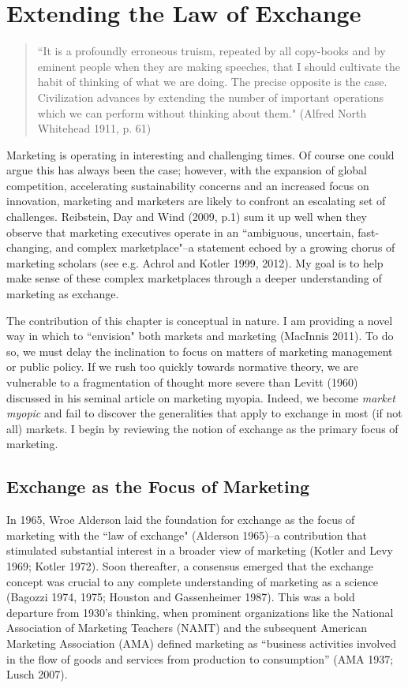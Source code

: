 \chapter{Extending the Law of Exchange\label{law}}

\begin{small}
\begin{quote}
``It is a profoundly erroneous truism, repeated by all copy-books and by eminent people when they are making speeches, that I should cultivate the habit of thinking of what we are doing. The precise opposite is the case. Civilization advances by extending the number of important operations which we can perform without thinking about them."	
(Alfred North Whitehead 1911, p. 61)
\end{quote}
\end{small}

Marketing is operating in interesting and challenging times. Of course one could argue this has always been the case; however, with the expansion of global competition, accelerating sustainability concerns and an increased focus on innovation, marketing and marketers are likely to confront an escalating set of challenges. Reibstein, Day and Wind (2009, p.1) sum it up well when they observe that marketing executives operate in an ``ambiguous, uncertain, fast-changing, and complex marketplace"--a statement echoed by a growing chorus of marketing scholars (see e.g. Achrol and Kotler 1999, 2012). My goal is to help make sense of these complex marketplaces through a deeper understanding of marketing as exchange. 

The contribution of this chapter is conceptual in nature. I am providing a novel way in which to ``envision" both markets and marketing (MacInnis 2011). To do so, we must delay the inclination to focus on matters of marketing management or public policy. If we rush too quickly towards normative theory, we are vulnerable to a fragmentation of thought more severe than Levitt (1960) discussed in his seminal article on marketing myopia. Indeed, we become \emph{market myopic} and fail to discover the generalities that apply to exchange in most (if not all) markets. I begin by reviewing the notion of exchange as the primary focus of marketing. 

\section{Exchange as the Focus of Marketing}
In 1965, Wroe Alderson laid the foundation for exchange as the focus of marketing with the ``law of exchange"  (Alderson 1965)--a contribution that stimulated substantial interest in a broader view of marketing (Kotler and Levy 1969; Kotler 1972).  Soon thereafter, a consensus emerged that the exchange concept was crucial to any complete understanding of marketing as a science (Bagozzi 1974, 1975; Houston and Gassenheimer 1987). This was a bold departure from 1930's thinking, when prominent organizations like the National Association of Marketing Teachers (NAMT) and the subsequent American Marketing Association (AMA) defined marketing as ``business activities involved in the flow of goods and services from production to consumption'' (AMA 1937; Lusch 2007). 

